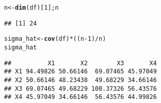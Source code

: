 \documentclass[11pt, a4paper]{article}\usepackage[]{graphicx}\usepackage[]{xcolor}
\makeatletter
\newcommand{\hlnum}[1]{\textcolor[rgb]{0.686,0.059,0.569}{#1}}%
\newcommand{\hlopt}[1]{\textcolor[rgb]{0,0,0}{#1}}%
\newcommand{\hldef}[1]{\textcolor[rgb]{0.345,0.345,0.345}{#1}}%
\newcommand{\hlkwb}[1]{\textcolor[rgb]{0.69,0.353,0.396}{#1}}%
\newcommand{\hlkwd}[1]{\textcolor[rgb]{0.737,0.353,0.396}{\textbf{#1}}}%
\newenvironment{kframe}{%
 \def\at@end@of@kframe{}%
 \ifinner\ifhmode%
  \def\at@end@of@kframe{\end{minipage}}%
  \begin{minipage}{\columnwidth}%
 \fi\fi%
 \def\FrameCommand##1{\hskip\@totalleftmargin \hskip-\fboxsep
 \colorbox{shadecolor}{##1}\hskip-\fboxsep
     \hskip-\linewidth \hskip-\@totalleftmargin \hskip\columnwidth}%
 \MakeFramed {\advance\hsize-\width
   \@totalleftmargin\z@ \linewidth\hsize
   \@setminipage}}%
 {\par\unskip\endMakeFramed%
 \at@end@of@kframe}
\newenvironment{knitrout}{}{} %
\makeatother
\begin{document}
\begin{knitrout}
\color{fgcolor}\begin{kframe}
\begin{alltt}
\hldef{n} \hlkwb{<-} \hlkwd{dim}\hldef{(df)[}\hlnum{1}\hldef{]; n}
\end{alltt}
\begin{verbatim}
## [1] 24
\end{verbatim}
\end{kframe}
\end{knitrout}

\begin{knitrout}
\color{fgcolor}\begin{kframe}
\begin{alltt}
\hldef{sigma_hat} \hlkwb{<-} \hlkwd{cov}\hldef{(df)} \hlopt{*} \hldef{((n}\hlopt{-}\hlnum{1}\hldef{)}\hlopt{/}\hldef{n)}
\hldef{sigma_hat}
\end{alltt}
\begin{verbatim}
##          X1       X2        X3       X4
## X1 94.49826 50.66146  69.07465 45.97049
## X2 50.66146 48.23438  49.68229 34.66146
## X3 69.07465 49.68229 100.37326 56.43576
## X4 45.97049 34.66146  56.43576 44.99826
\end{verbatim}
\end{kframe}
\end{knitrout}
\end{document}
